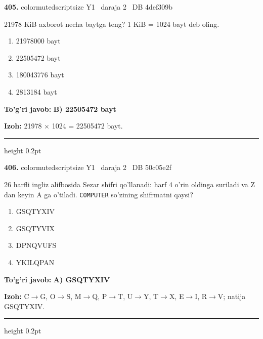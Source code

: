 \documentclass[10pt,a4paper,oneside]{article}
\begin{document}
\noindent\textbf{\color{ink}405.}  {color{muted}scriptsize Y1 \textbullet\ daraja 2 \textbullet\ DB 4def309b}
\par
21978 KiB axborot necha baytga teng? 1 KiB = 1024 bayt deb oling.
\begin{enumerate}[label=\Alph*),leftmargin=9mm]
\item 21978000 bayt
\item 22505472 bayt
\item 180043776 bayt
\item 2813184 bayt
\end{enumerate}
\begin{tcolorbox}[enhanced,breakable,colback=teal!4,colframe=teal!50!black,boxrule=0.5pt,arc=1.1mm,left=3mm,right=3mm,top=1.7mm,bottom=1.7mm,before skip=2mm,after skip=2mm]
\textbf{\color{teal}To'g'ri javob:} \textbf{B) 22505472 bayt}
\par\smallskip
\textbf{Izoh:} 21978 \ensuremath{\times} 1024 = 22505472 bayt.
\end{tcolorbox}
\vspace{2mm}\hrule height 0.2pt \vspace{3mm}

\noindent\textbf{\color{ink}406.}  {color{muted}scriptsize Y1 \textbullet\ daraja 2 \textbullet\ DB 50c05e2f}
\par
26 harfli ingliz alifbosida Sezar shifri qo'llanadi: harf 4 o'rin oldinga suriladi va Z dan keyin A ga o'tiladi. \texttt{COMPUTER} so'zining shifrmatni qaysi?
\begin{enumerate}[label=\Alph*),leftmargin=9mm]
\item GSQTYXIV
\item GSQTYVIX
\item DPNQVUFS
\item YKILQPAN
\end{enumerate}
\begin{tcolorbox}[enhanced,breakable,colback=teal!4,colframe=teal!50!black,boxrule=0.5pt,arc=1.1mm,left=3mm,right=3mm,top=1.7mm,bottom=1.7mm,before skip=2mm,after skip=2mm]
\textbf{\color{teal}To'g'ri javob:} \textbf{A) GSQTYXIV}
\par\smallskip
\textbf{Izoh:} C\ensuremath{\to}G, O\ensuremath{\to}S, M\ensuremath{\to}Q, P\ensuremath{\to}T, U\ensuremath{\to}Y, T\ensuremath{\to}X, E\ensuremath{\to}I, R\ensuremath{\to}V; natija GSQTYXIV.
\end{tcolorbox}
\vspace{2mm}\hrule height 0.2pt \vspace{3mm}
\end{document}
